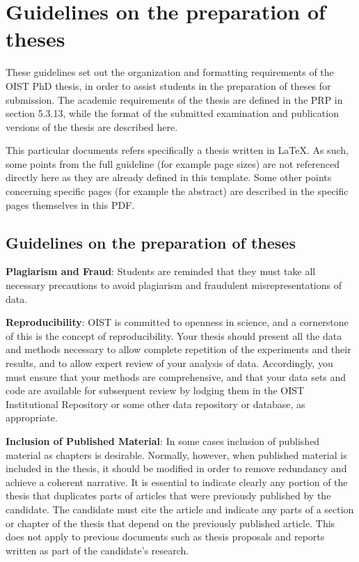 
\chapter{Guidelines on the preparation of theses} \label{ch-1}

These guidelines set out the organization and formatting requirements of the OIST PhD thesis, in order to assist students in the preparation of theses for submission. The academic requirements of the thesis are defined in the PRP in section 5.3.13, while the format of the submitted examination and publication versions of the thesis are described here.

This particular documents refers specifically a thesis written in \LaTeX. As such, some points from the full guideline (for example page sizes) are not referenced directly here as they are already defined in this template. Some other points concerning specific pages (for example the abstract) are described in the specific pages themselves in this PDF.

\section{Guidelines on the preparation of theses}

\textbf{Plagiarism and Fraud}:  Students are reminded that they must take all necessary precautions to avoid plagiarism and fraudulent misrepresentations of data. 

\textbf{Reproducibility}: OIST is committed to openness in science, and a cornerstone of this is the concept of reproducibility.  Your thesis should present all the data and methods necessary to allow complete repetition of the experiments and their results, and to allow expert review of your analysis of data.  Accordingly, you must ensure that your methods are comprehensive, and that your data sets and code are available for subsequent review by lodging them in the OIST Institutional Repository or some other data repository or database, as appropriate.

\textbf{Inclusion of Published Material}: In some cases inclusion of published material as chapters is desirable. Normally, however, when published material is included in the thesis, it should be modified in order to remove redundancy and achieve a coherent narrative. It is essential to indicate clearly any portion of the thesis that duplicates parts of articles that were previously published by the candidate. The candidate must cite the article and indicate any parts of a section or chapter of the thesis that depend on the previously published article. This does not apply to previous documents such as thesis proposals and reports written as part of the candidate's research.


